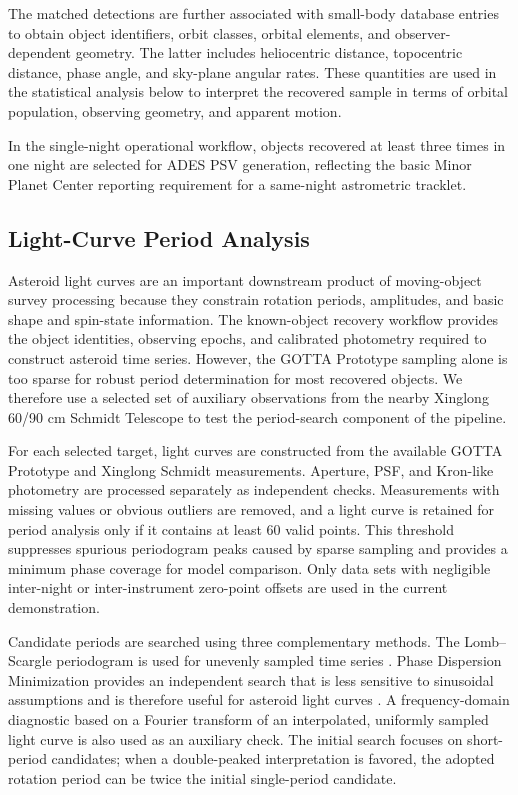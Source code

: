 \documentclass[referee]{raa}
\begin{document}
The matched detections are further associated with small-body database entries to obtain object identifiers, orbit classes, orbital elements, and observer-dependent geometry. The latter includes heliocentric distance, topocentric distance, phase angle, and sky-plane angular rates. These quantities are used in the statistical analysis below to interpret the recovered sample in terms of orbital population, observing geometry, and apparent motion.

In the single-night operational workflow, objects recovered at least three times in one night are selected for ADES PSV generation, reflecting the basic Minor Planet Center reporting requirement for a same-night astrometric tracklet.

\subsection{Light-Curve Period Analysis}
\label{sec:method_lightcurve}

Asteroid light curves are an important downstream product of moving-object survey processing because they constrain rotation periods, amplitudes, and basic shape and spin-state information. The known-object recovery workflow provides the object identities, observing epochs, and calibrated photometry required to construct asteroid time series. However, the GOTTA Prototype sampling alone is too sparse for robust period determination for most recovered objects. We therefore use a selected set of auxiliary observations from the nearby Xinglong 60/90 cm Schmidt Telescope to test the period-search component of the pipeline.

For each selected target, light curves are constructed from the available GOTTA Prototype and Xinglong Schmidt measurements. Aperture, PSF, and Kron-like photometry are processed separately as independent checks. Measurements with missing values or obvious outliers are removed, and a light curve is retained for period analysis only if it contains at least 60 valid points. This threshold suppresses spurious periodogram peaks caused by sparse sampling and provides a minimum phase coverage for model comparison. Only data sets with negligible inter-night or inter-instrument zero-point offsets are used in the current demonstration.

Candidate periods are searched using three complementary methods. The Lomb--Scargle periodogram is used for unevenly sampled time series \citep{Lomb1976,Scargle1982}. Phase Dispersion Minimization provides an independent search that is less sensitive to sinusoidal assumptions and is therefore useful for asteroid light curves \citep{Stellingwerf1978}. A frequency-domain diagnostic based on a Fourier transform of an interpolated, uniformly sampled light curve is also used as an auxiliary check. The initial search focuses on short-period candidates; when a double-peaked interpretation is favored, the adopted rotation period can be twice the initial single-period candidate.
\end{document}
